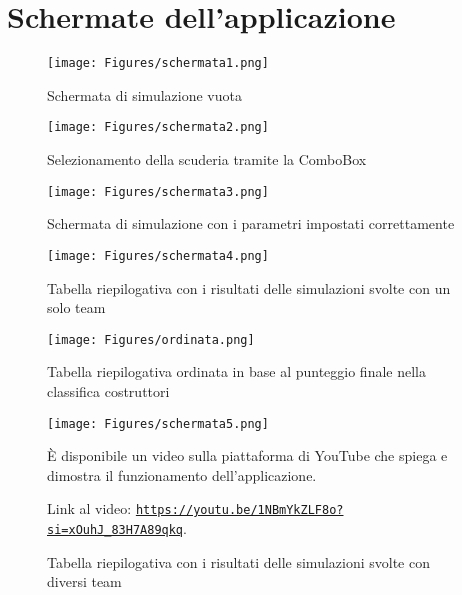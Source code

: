 \chapter{Schermate dell'applicazione}


\begin{figure}[h!]
    \centering    
        \texttt{[image: Figures/schermata1.png]}
        \caption{Schermata di simulazione vuota}
        \label{fig:schermata_simulazione_vuota}
\end{figure}
\begin{figure}[h!]
        \texttt{[image: Figures/schermata2.png]}
        \caption{Selezionamento della scuderia tramite la ComboBox}
        \label{fig:selezionamento_scuderia}
\end{figure}

\begin{figure}[h!]
    \centering
    \texttt{[image: Figures/schermata3.png]}
    \caption{Schermata di simulazione con i parametri impostati correttamente}
    \label{fig:schermata_simulazione_parametri}
\end{figure}

\begin{figure}[h!]
    \centering
        \texttt{[image: Figures/schermata4.png]}
        \caption{Tabella riepilogativa con i risultati delle simulazioni svolte con un solo team}
        \label{fig:tabella_riepilogativa_singolo_team}
    \hspace{1cm}
        \texttt{[image: Figures/ordinata.png]}
        \caption{Tabella riepilogativa ordinata in base al punteggio finale nella classifica costruttori}
        \label{fig:tabella_riepilogativa_ordine_punteggio}
\end{figure}

\begin{figure}[h!]
    \centering
    \texttt{[image: Figures/schermata5.png]}
    \caption{Tabella riepilogativa con i risultati delle simulazioni svolte con diversi team}
    \label{fig:tabella_riepilogativa_diversi_team}


\vspace{8cm}
È disponibile un video sulla piattaforma di YouTube che spiega e dimostra il funzionamento dell'applicazione.

\hypersetup{
    colorlinks=true,
    linkcolor=blue,
    urlcolor=blue
}

Link al video: \href{https://youtu.be/1NBmYkZLF8o?si=xOuhJ_83H7A89qkq}{\texttt{https://youtu.be/1NBmYkZLF8o?si=xOuhJ_83H7A89qkq}}.

\end{figure}
